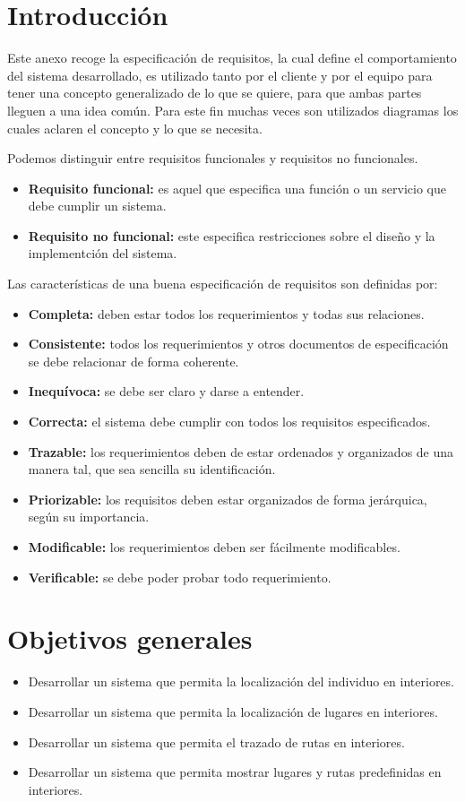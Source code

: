 
\section{Introducción}
Este anexo recoge la especificación de requisitos, la cual define el comportamiento del sistema desarrollado, es utilizado tanto por el cliente y por el equipo para tener una concepto generalizado de lo que se quiere, para que ambas partes lleguen a una idea común. Para este fin muchas veces son utilizados diagramas los cuales aclaren el concepto y lo que se necesita.

Podemos distinguir entre requisitos funcionales y requisitos no funcionales.
\begin{itemize}
\item
\textbf{Requisito funcional:} es aquel que especifica una función o un servicio que debe cumplir un sistema.
\item
\textbf{Requisito no funcional:} este especifica restricciones sobre el diseño y la implementción del sistema.
\end{itemize}

Las características de una buena especificación de requisitos son definidas por:
\begin{itemize}
\item
\textbf{Completa:} deben estar todos los requerimientos y todas sus relaciones.
\item
\textbf{Consistente:} todos los requerimientos y otros documentos de especificación se debe relacionar de forma coherente.
\item
\textbf{Inequívoca:} se debe ser claro y darse a entender.
\item
\textbf{Correcta:} el sistema debe cumplir con todos los requisitos especificados.
\item
\textbf{Trazable:} los requerimientos deben de estar ordenados y organizados de una manera tal, que sea sencilla su identificación.
\item
\textbf{Priorizable:} los requisitos deben estar organizados de forma jerárquica, según su importancia.
\item
\textbf{Modificable:} los requerimientos deben ser fácilmente modificables.
\item
\textbf{Verificable:} se debe poder probar todo requerimiento.
\end{itemize}


\section{Objetivos generales}
\begin{itemize}
\item
Desarrollar un sistema que permita la localización del individuo en interiores.
\item
Desarrollar un sistema que permita la localización de lugares en interiores.
\item
Desarrollar un sistema que permita el trazado de rutas en interiores.
\item
Desarrollar un sistema que permita mostrar lugares y rutas predefinidas en interiores.
\end{itemize}
